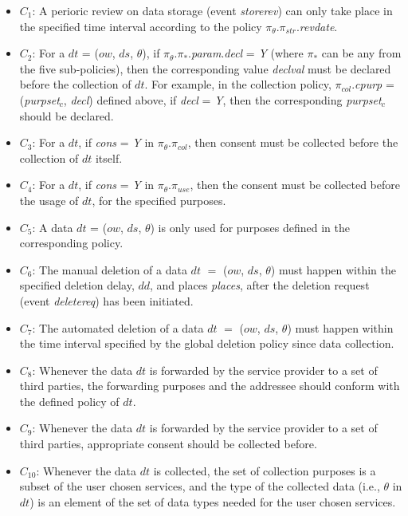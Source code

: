 \documentclass[a4paper]{article}
\begin{document}
\begin{itemize}
\item $C_1$: A perioric review on data storage (event \textit{storerev}) can only take place in the specified time interval according to the policy $\pi_{\theta}$.$\pi_{str}$.\textit{revdate}.   
\item $C_2$: For a $dt$ = ($ow$, $ds$, $\theta$), if  $\pi_{\theta}.\pi_{\ast}$.\textit{param}.\textit{decl} = \textit{Y} (where $\pi_{\ast}$ can be any from the five sub-policies), then the corresponding value \textit{declval} must be declared before the collection of $dt$. For example, in the collection policy, $\pi_{col}$.\textit{cpurp} = (\textit{purpset}$_c$, \textit{decl}) defined above, if  \textit{decl} = \textit{Y}, then the corresponding \textit{purpset}$_c$ should be declared.   
\item $C_3$: For a $dt$, if \textit{cons} = \textit{Y} in $\pi_{\theta}$.$\pi_{col}$, then consent must be collected before the collection of $dt$ itself.   
\item $C_4$: For a $dt$, if \textit{cons} = \textit{Y} in $\pi_{\theta}$.$\pi_{use}$, then the consent must be collected before the usage of $dt$, for the specified purposes. 
\item $C_5$: A data $dt$ = ($ow$, $ds$, $\theta$) is only used for purposes defined in the corresponding policy. 
\item $C_{6}$: The manual deletion of a data $dt$ $=$ ($ow$, $ds$, $\theta$) must happen within the specified deletion delay, $dd$, and places \textit{places},   
after the deletion request (event \textit{deletereq}) has been initiated.
\item $C_{7}$: The automated deletion of a data $dt$ $=$ ($ow$, $ds$, $\theta$) must happen  within the time interval specified by the global deletion policy since data collection. 
\item $C_{8}$: Whenever the data $dt$ is forwarded by the service provider to a set of third parties, the forwarding purposes and the addressee should conform with the defined policy of $dt$.  
\item $C_{9}$: Whenever the data $dt$ is forwarded by the service provider to a set of third parties, appropriate consent should be collected before.    
\item $C_{10}$: Whenever the data $dt$ is collected, the set of collection purposes is a subset of the user chosen services, and the type of the collected data (i.e., $\theta$ in $dt$) is an element of the set of data types needed for the user chosen services.    
\end{itemize}
  
\end{document}

